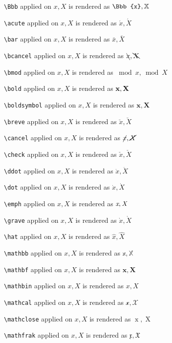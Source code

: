 \texttt{\textbackslash Bbb} applied on $x,X$ is rendered as $\Bbb{x},\Bbb{X}$


\texttt{\textbackslash acute} applied on $x,X$ is rendered as $\acute{x},\acute{X}$


\texttt{\textbackslash bar} applied on $x,X$ is rendered as $\bar{x},\bar{X}$


\texttt{\textbackslash bcancel} applied on $x,X$ is rendered as $\bcancel{x},\bcancel{X}$


\texttt{\textbackslash bmod} applied on $x,X$ is rendered as $\bmod{x},\bmod{X}$


\texttt{\textbackslash bold} applied on $x,X$ is rendered as $\bold{x},\bold{X}$


\texttt{\textbackslash boldsymbol} applied on $x,X$ is rendered as $\boldsymbol{x},\boldsymbol{X}$


\texttt{\textbackslash breve} applied on $x,X$ is rendered as $\breve{x},\breve{X}$


\texttt{\textbackslash cancel} applied on $x,X$ is rendered as $\cancel{x},\cancel{X}$


\texttt{\textbackslash check} applied on $x,X$ is rendered as $\check{x},\check{X}$


\texttt{\textbackslash ddot} applied on $x,X$ is rendered as $\ddot{x},\ddot{X}$


\texttt{\textbackslash dot} applied on $x,X$ is rendered as $\dot{x},\dot{X}$


\texttt{\textbackslash emph} applied on $x,X$ is rendered as $\emph{x},\emph{X}$


\texttt{\textbackslash grave} applied on $x,X$ is rendered as $\grave{x},\grave{X}$


\texttt{\textbackslash hat} applied on $x,X$ is rendered as $\hat{x},\hat{X}$


\texttt{\textbackslash mathbb} applied on $x,X$ is rendered as $\mathbb{x},\mathbb{X}$


\texttt{\textbackslash mathbf} applied on $x,X$ is rendered as $\mathbf{x},\mathbf{X}$


\texttt{\textbackslash mathbin} applied on $x,X$ is rendered as $\mathbin{x},\mathbin{X}$


\texttt{\textbackslash mathcal} applied on $x,X$ is rendered as $\mathcal{x},\mathcal{X}$


\texttt{\textbackslash mathclose} applied on $x,X$ is rendered as $\mathclose{x},\mathclose{X}$


\texttt{\textbackslash mathfrak} applied on $x,X$ is rendered as $\mathfrak{x},\mathfrak{X}$


